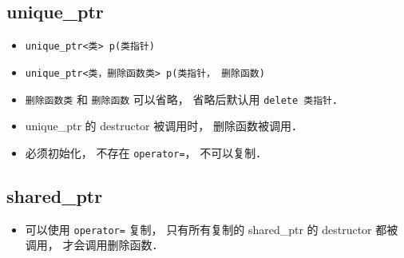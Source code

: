 
\begin{issues}
\issueDraft
\end{issues}

\subsection{unique_ptr}
\begin{itemize}
\item \verb|unique_ptr<类> p(类指针)|
\item \verb|unique_ptr<类，删除函数类> p(类指针， 删除函数)|
\item \verb|删除函数类| 和 \verb|删除函数| 可以省略， 省略后默认用 \verb|delete 类指针|．
\item unique_ptr 的 destructor 被调用时， 删除函数被调用．
\item 必须初始化， 不存在 \verb|operator=|， 不可以复制．
\end{itemize}

\subsection{shared_ptr}
\begin{itemize}
\item 可以使用 \verb|operator=| 复制， 只有所有复制的 shared_ptr 的 destructor 都被调用， 才会调用删除函数．
\end{itemize}
